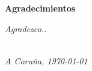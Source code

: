 \vspace*{4em}

{\Huge\bfseries{Agradecimientos}\par}

\vspace*{2em}

\textit{Agradezco..}\par

\vspace*{\fill}

\begin{flushright}
	\authors \\
	\textit{A Coruña, \today}
\end{flushright}